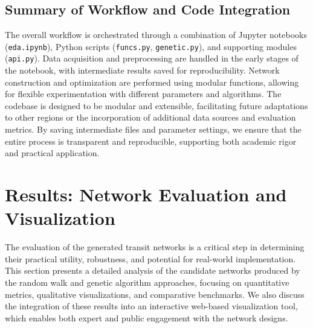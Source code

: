 \documentclass[manuscript,screen,review]{acmart}
\begin{document}
\subsection{Summary of Workflow and Code Integration}
The overall workflow is orchestrated through a combination of Jupyter notebooks (\texttt{eda.ipynb}), Python scripts (\texttt{funcs.py}, \texttt{genetic.py}), and supporting modules (\texttt{api.py}). Data acquisition and preprocessing are handled in the early stages of the notebook, with intermediate results saved for reproducibility. Network construction and optimization are performed using modular functions, allowing for flexible experimentation with different parameters and algorithms. The codebase is designed to be modular and extensible, facilitating future adaptations to other regions or the incorporation of additional data sources and evaluation metrics. By saving intermediate files and parameter settings, we ensure that the entire process is transparent and reproducible, supporting both academic rigor and practical application.

\section{Results: Network Evaluation and Visualization}

The evaluation of the generated transit networks is a critical step in determining their practical utility, robustness, and potential for real-world implementation. This section presents a detailed analysis of the candidate networks produced by the random walk and genetic algorithm approaches, focusing on quantitative metrics, qualitative visualizations, and comparative benchmarks. We also discuss the integration of these results into an interactive web-based visualization tool, which enables both expert and public engagement with the network designs.
\end{document}
